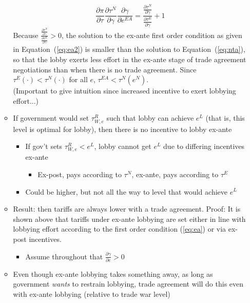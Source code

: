 \documentclass[12pt]{article}
\newcommand{\ga}{\gamma}
\begin{document}
\begin{itemize}
\begin{itemize}
				  \begin{equation}
					  \frac{\partial \pi}{\partial \tau} \frac{\partial \tau^N}{\partial \ga} \frac{\partial \ga}{\partial e^{EA}} = \frac{\frac{\partial \tau^N}{\partial \ga}}{\frac{\partial \tau^E}{\partial \ga}} + 1
						\label{eq:ea2}
					\end{equation}
				Because $\frac{\frac{\partial \tau^N}{\partial \ga}}{\frac{\partial \tau^E}{\partial \ga}} > 0$, the solution to the ex-ante first order condition as given in Equation~(\ref{eq:ea2}) is smaller than the solution to Equation~(\ref{eq:nta}), so that the lobby exerts less effort in the ex-ante stage of trade agreement negotiations than when there is no trade agreement. Since $\tau^E(\cdot) < \tau^N(\cdot)$ for all $e$, $\tau^{EA} < \tau^N(e^N)$. \\
			(Important to give intuition since increased incentive to exert lobbying effort...)
				\item If government would set $\tau^R_{W,e}$ such that lobby can achieve $e^L$ (that is, this level is optimal for lobby), then there is no incentive to lobby ex-ante
		\begin{itemize}
			\item If gov't sets $\tau^R_{W,e} < e^L$, lobby cannot get $e^L$ due to differing incentives ex-ante 
						\begin{itemize}
							\item Ex-post, pays according to $\tau^N$, ex-ante, pays according to $\tau^E$
						\end{itemize}
					\item Could be higher, but not all the way to level that would achieve $e^L$
				\end{itemize}
			\item Result: then tariffs are always lower with a trade agreement.
			Proof: It is shown above that tariffs under ex-ante lobbying are set either in line with lobbying effort according to the first order condition (\ref{eq:ea}) or via ex-post incentives. 
				\begin{itemize}
					\item Assume throughout that $\frac{\partial \ga}{\partial e} > 0$
				\end{itemize}
			\item Even though ex-ante lobbying takes something away, as long as government \textit{wants} to restrain lobbying, trade agreement will do this even with ex-ante lobbying (relative to trade war level)
				\begin{itemize}

\end{itemize}
\end{itemize}
\end{itemize}
\end{document}
